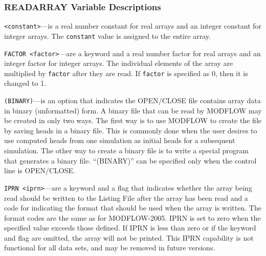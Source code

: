 \subsubsection{READARRAY Variable Descriptions}

\begin{description}

\item \texttt{<constant>}---is a real number constant for real arrays and an integer constant for integer arrays. The \texttt{constant} value is assigned to the entire array. 

\item \texttt{FACTOR <factor>}---are a keyword and a real number factor for real arrays and an integer factor for integer arrays. The individual elements of the array are multiplied by \texttt{factor} after they are read. If \texttt{factor} is specified as 0, then it is changed to 1.

\item \texttt{(BINARY)}---is an option that indicates the OPEN/CLOSE file contains array data in binary (unformatted) form. A binary file that can be read by MODFLOW may be created in only two ways. The first way is to use MODFLOW to create the file by saving heads in a binary file. This is commonly done when the user desires to use computed heads from one simulation as initial heads for a subsequent simulation. The other way to create a binary file is to write a special program that generates a binary file.  ``(BINARY)'' can be specified only when the control line is OPEN/CLOSE.

\item \texttt{IPRN <iprn>}---are a keyword and a flag that indicates whether the array being read should be written to the Listing File after the array has been read and a code for indicating the format that should be used when the array is written. The format codes are the same as for MODFLOW-2005. IPRN is set to zero when the specified value exceeds those defined. If IPRN is less than zero or if the keyword and flag are omitted, the array will not be printed.  This IPRN capability is not functional for all data sets, and may be removed in future versions.

\end{description}

